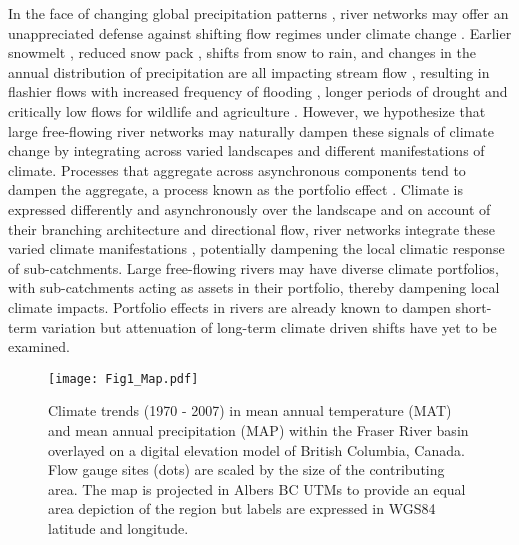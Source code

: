 \documentclass[draft,linenumbers]{AGUJournal}
\begin{document}
	In the face of changing global precipitation patterns \citep{Donat:2016}, river networks may offer an unappreciated defense against shifting flow regimes under climate change \citep{Hartmann:2013,Palmer:2009}. Earlier snowmelt \citep{Rauscher:2008}, reduced snow pack \citep{McCabe:2014}, shifts from snow to rain, and changes in the annual distribution of precipitation are all impacting stream flow \citep{Hartmann:2013}, resulting in flashier flows with increased frequency of flooding \citep{Hirabayashi:2013}, longer periods of drought and critically low flows for wildlife and agriculture \citep{Melillo:2014}. However, we hypothesize that large free-flowing river networks may naturally dampen these signals of climate change by integrating across varied landscapes and different manifestations of climate. Processes that aggregate across asynchronous components tend to dampen the aggregate, a process known as the portfolio effect \citep{Doak:1998}. Climate is expressed differently and asynchronously over the landscape \citep [e.g.,][]{Wang:2012} and on account of their branching architecture and directional flow, river networks integrate these varied climate manifestations \citep{Peterson:2013}, potentially dampening the local climatic response of sub-catchments. Large free-flowing rivers may have diverse climate portfolios, with sub-catchments acting as assets in their portfolio, thereby dampening local climate impacts. Portfolio effects in rivers are already known to dampen short-term variation \citep{Moore:2015,Yeakel:2014} but attenuation of long-term climate driven shifts have yet to be examined.

\begin{figure}[h]
\centering
\texttt{[image: Fig1\_Map.pdf]}
	\caption{Climate trends (1970 - 2007) in mean annual temperature (MAT) and mean annual precipitation (MAP) within the Fraser River basin overlayed on a digital elevation model of British Columbia, Canada. Flow gauge sites (dots) are scaled by the size of the contributing area. The map is projected in Albers BC UTMs to provide an equal area depiction of the region but labels are expressed in WGS84 latitude and longitude.}
\label{fig:1}
\end{figure}
\end{document}
